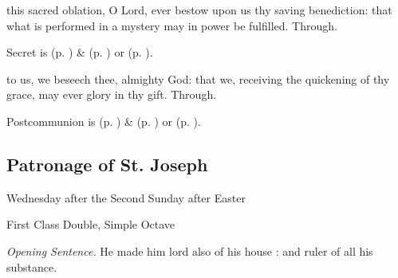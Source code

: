 \secret\label{EasterIISecret}
 this sacred oblation, O Lord, ever bestow upon us thy saving benediction: that what is performed in a mystery may in power be fulfilled. Through.
\begin{rubric}
     Secret is  (p. \pageref{SPMaryInEaster}) \&   (p. \pageref{SPAgainst}) or  (p. \pageref{SPChiefBishop}).
\end{rubric}
\postcommunion\label{EasterIIPostcommunion}
 to us, we beseech thee, almighty God: that we, receiving the quickening of thy grace, may ever glory in thy gift. Through.


\begin{rubric}
     Postcommunion is  (p. \pageref{SPMaryInEaster}) \&   (p. \pageref{SPAgainst}) or  (p. \pageref{SPChiefBishop}).
\end{rubric}


\clearpage
\subsection{Patronage of St. Joseph}
\begin{inhead}
    {Wednesday after the Second Sunday after Easter}\par
    {First Class Double, Simple Octave}
\end{inhead}
\par\noindent
\textit{Opening Sentence.} He made him lord also of his house : and ruler of all his substance.

